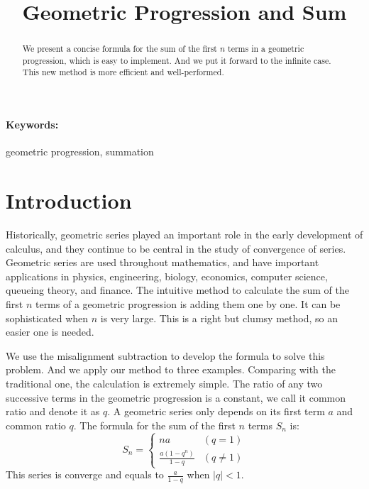 
\title{Geometric Progression and Sum}
\author{}
\date{}

\maketitle



\begin{abstract}
    We present a concise formula for the sum of the first $n$ terms in a geometric progression, which is easy to implement. And we put it forward to the infinite case. This new method is more efficient and well-performed.
\end{abstract}
\paragraph{Keywords:} geometric progression, summation



\section{Introduction}\label{S:introduction}
Historically, geometric series played an important role in the early development of calculus, and they continue to be central in the study of convergence of series. Geometric series are used throughout mathematics, and have important applications in physics, engineering, biology, economics, computer science, queueing theory, and finance. The intuitive method to calculate the sum of the first $n$ terms of a geometric progression is adding them one by one. It can be sophisticated when $n$ is very large. This is a right but clumsy method, so an easier one is needed. 

We use the misalignment subtraction to develop the formula to solve this problem. And we apply our method to three examples. Comparing with the traditional one, the calculation is extremely simple. The ratio of any two successive terms in the geometric progression is a constant, we call it common ratio and denote it as $q$. A geometric series only depends on its first term $a$ and common ratio $q$. The formula for the sum of the first $n$ terms $S_n$ is:
\begin{equation*}
    S_n = \begin{cases}
        na & (q=1) \\
        \frac{{a\left(1-q^{{n}}\right)}}{{1-q}} & (q\neq 1)
        \end{cases}
\end{equation*}
This series is converge and equals to $\frac{{a}}{{1-q}}$ when $|q|<1$.


